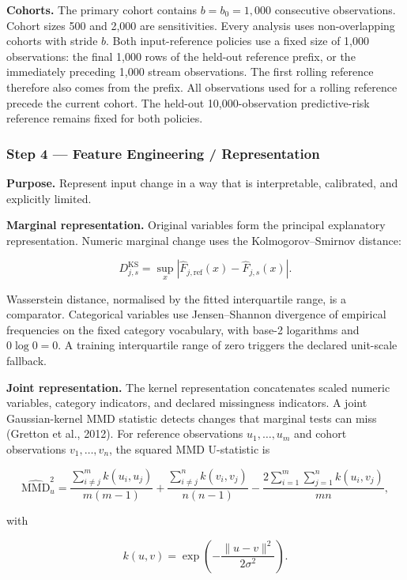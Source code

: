 \documentclass[
]{article}
\begin{document}
\textbf{Cohorts.} The primary cohort contains \(b=b_0=1{,}000\)
consecutive observations. Cohort sizes 500 and 2,000 are sensitivities.
Every analysis uses non-overlapping cohorts with stride \(b\). Both
input-reference policies use a fixed size of 1,000 observations: the
final 1,000 rows of the held-out reference prefix, or the immediately
preceding 1,000 stream observations. The first rolling reference
therefore also comes from the prefix. All observations used for a
rolling reference precede the current cohort. The held-out
10,000-observation predictive-risk reference remains fixed for both
policies.

\hypertarget{step-4-feature-engineering-representation}{%
\subsubsection{Step 4 --- Feature Engineering /
Representation}\label{step-4-feature-engineering-representation}}

\textbf{Purpose.} Represent input change in a way that is interpretable,
calibrated, and explicitly limited.

\textbf{Marginal representation.} Original variables form the principal
explanatory representation. Numeric marginal change uses the
Kolmogorov--Smirnov distance:

\[
D_{j,s}^{\mathrm{KS}}=\sup_x\left|\widehat{F}_{j,\mathrm{ref}}(x)-\widehat{F}_{j,s}(x)\right|.
\]

Wasserstein distance, normalised by the fitted interquartile range, is a
comparator. Categorical variables use Jensen--Shannon divergence of
empirical frequencies on the fixed category vocabulary, with base-2
logarithms and \(0\log 0=0\). A training interquartile range of zero
triggers the declared unit-scale fallback.

\textbf{Joint representation.} The kernel representation concatenates
scaled numeric variables, category indicators, and declared missingness
indicators. A joint Gaussian-kernel MMD statistic detects changes that
marginal tests can miss (Gretton et al., 2012). For reference
observations \(u_1,\ldots,u_m\) and cohort observations
\(v_1,\ldots,v_n\), the squared MMD U-statistic is

\[
\widehat{\mathrm{MMD}}_u^2
=\frac{\sum_{i\ne j}^{m}k(u_i,u_j)}{m(m-1)}
+\frac{\sum_{i\ne j}^{n}k(v_i,v_j)}{n(n-1)}
-\frac{2\sum_{i=1}^{m}\sum_{j=1}^{n}k(u_i,v_j)}{mn},
\]

with

\[
k(u,v)=\exp\left(-\frac{\|u-v\|^2}{2\sigma^2}\right).
\]
\end{document}
